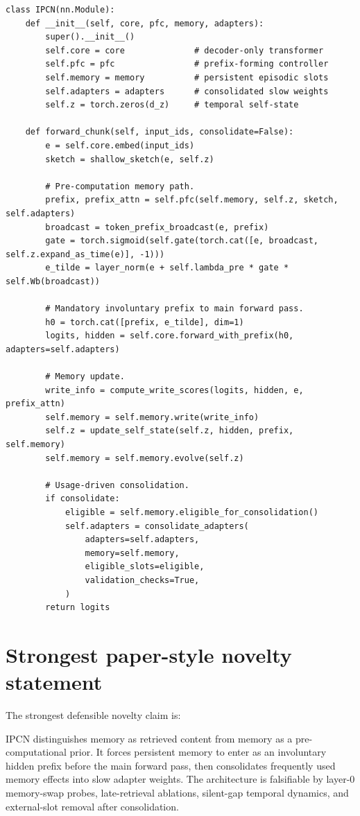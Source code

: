 \documentclass[11pt]{article}
\begin{document}
\begin{lstlisting}[caption={PyTorch-style module skeleton.}]
class IPCN(nn.Module):
    def __init__(self, core, pfc, memory, adapters):
        super().__init__()
        self.core = core              # decoder-only transformer
        self.pfc = pfc                # prefix-forming controller
        self.memory = memory          # persistent episodic slots
        self.adapters = adapters      # consolidated slow weights
        self.z = torch.zeros(d_z)     # temporal self-state

    def forward_chunk(self, input_ids, consolidate=False):
        e = self.core.embed(input_ids)
        sketch = shallow_sketch(e, self.z)

        # Pre-computation memory path.
        prefix, prefix_attn = self.pfc(self.memory, self.z, sketch, self.adapters)
        broadcast = token_prefix_broadcast(e, prefix)
        gate = torch.sigmoid(self.gate(torch.cat([e, broadcast, self.z.expand_as_time(e)], -1)))
        e_tilde = layer_norm(e + self.lambda_pre * gate * self.Wb(broadcast))

        # Mandatory involuntary prefix to main forward pass.
        h0 = torch.cat([prefix, e_tilde], dim=1)
        logits, hidden = self.core.forward_with_prefix(h0, adapters=self.adapters)

        # Memory update.
        write_info = compute_write_scores(logits, hidden, e, prefix_attn)
        self.memory = self.memory.write(write_info)
        self.z = update_self_state(self.z, hidden, prefix, self.memory)
        self.memory = self.memory.evolve(self.z)

        # Usage-driven consolidation.
        if consolidate:
            eligible = self.memory.eligible_for_consolidation()
            self.adapters = consolidate_adapters(
                adapters=self.adapters,
                memory=self.memory,
                eligible_slots=eligible,
                validation_checks=True,
            )
        return logits
\end{lstlisting}

\section{Strongest paper-style novelty statement}

The strongest defensible novelty claim is:

\begin{specbox}
IPCN distinguishes memory as retrieved content from memory as a pre-computational prior. It forces persistent memory to enter as an involuntary hidden prefix before the main forward pass, then consolidates frequently used memory effects into slow adapter weights. The architecture is falsifiable by layer-0 memory-swap probes, late-retrieval ablations, silent-gap temporal dynamics, and external-slot removal after consolidation.
\end{specbox}
\end{document}

